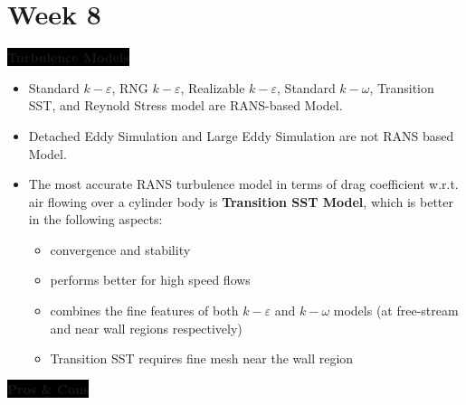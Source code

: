 \section{Week 8}

\colorbox{black}{\textbf{\color{white}Turbulence Models}}

\begin{itemize}
    \item Standard $k-\varepsilon$, RNG $k-\varepsilon$, Realizable $k-\varepsilon$, Standard $k-\omega$, Transition SST, and Reynold Stress model are RANS-based Model.
    \item Detached Eddy Simulation and Large Eddy Simulation are not RANS based Model.
    \item The most accurate RANS turbulence model in terms of drag coefficient w.r.t. air flowing over a cylinder body is \textbf{\color{orange}Transition SST Model}, which is better in the following aspects:
    \begin{itemize}
        \item convergence and stability
        \item performs better for high speed flows
        \item combines the fine features of both $k-\varepsilon$ and $k-\omega$ models (at free-stream and near wall regions respectively)
        \item Transition SST requires fine mesh near the wall region
    \end{itemize}
\end{itemize}

\colorbox{black}{\textbf{\color{white}Pros \& Cons}}

